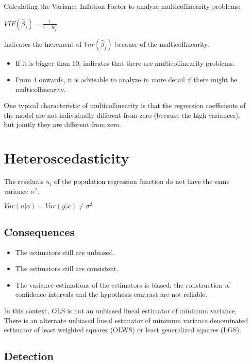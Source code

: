 \documentclass[10pt, a4paper, landscape]{extarticle}
\begin{document}
\begin{multicols}{3}
Calculating the Variance Inflation Factor to analyze multicollinearity problems:

$VIF(\hat{\beta}_j) = \frac{1}{1-R_j^2}$

Indicates the increment of $Var(\hat{\beta}_j)$ because of the multicollinearity.

\begin{itemize}[leftmargin=*]
\item If it is bigger than 10, indicates that there are multicollinearity problems.
\item From 4 onwards, it is advisable to analyze in more detail if there might be
multicollinearity.
\end{itemize}

One typical characteristic of multicollinearity is that the regression coefficients of the model are not individually different from zero (because the high variances), but jointly they are different from zero.

\section*{Heteroscedasticity}

The residuals $u_i$ of the population regression function do not have the same variance $\sigma^2$:

$Var(u|x) = Var(y|x) \neq \sigma^2$

\subsection*{Consequences}

\begin{itemize}[leftmargin=*]
\item The estimators still are unbiased.
\item The estimators still are consistent.
\item The variance estimations of the estimators is biased: the construction of confidence intervals and the hypothesis contrast are not reliable.
\end{itemize}

In this context, OLS is not an unbiased lineal estimator of minimum variance. There is an alternate unbiased lineal estimator of minimum variance denominated estimator of least weighted squares (OLWS) or least generalized squares (LGS).

\subsection*{Detection}


\end{multicols}
\end{document}
